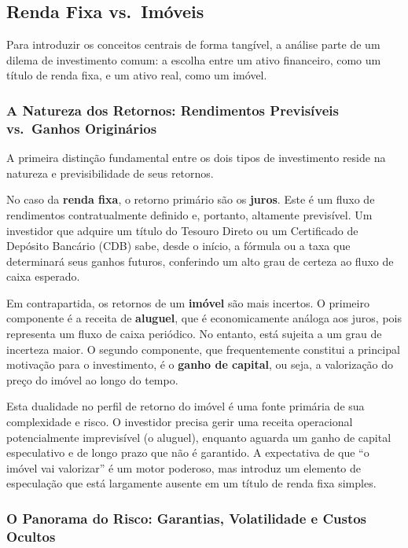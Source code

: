 \documentclass[
  a4paper,
]{book}
\begin{document}
\subsection{Renda Fixa vs.~Imóveis}\label{renda-fixa-vs.-imuxf3veis}

Para introduzir os conceitos centrais de forma tangível, a análise parte
de um dilema de investimento comum: a escolha entre um ativo financeiro,
como um título de renda fixa, e um ativo real, como um imóvel.

\subsubsection{A Natureza dos Retornos: Rendimentos Previsíveis
vs.~Ganhos
Originários}\label{a-natureza-dos-retornos-rendimentos-previsuxedveis-vs.-ganhos-originuxe1rios}

A primeira distinção fundamental entre os dois tipos de investimento
reside na natureza e previsibilidade de seus retornos.

No caso da \textbf{renda fixa}, o retorno primário são os
\textbf{juros}. Este é um fluxo de rendimentos contratualmente definido
e, portanto, altamente previsível. Um investidor que adquire um título
do Tesouro Direto ou um Certificado de Depósito Bancário (CDB) sabe,
desde o início, a fórmula ou a taxa que determinará seus ganhos futuros,
conferindo um alto grau de certeza ao fluxo de caixa esperado.

Em contrapartida, os retornos de um \textbf{imóvel} são mais incertos. O
primeiro componente é a receita de \textbf{aluguel}, que é
economicamente análoga aos juros, pois representa um fluxo de caixa
periódico. No entanto, está sujeita a um grau de incerteza maior. O
segundo componente, que frequentemente constitui a principal motivação
para o investimento, é o \textbf{ganho de capital}, ou seja, a
valorização do preço do imóvel ao longo do tempo.

Esta dualidade no perfil de retorno do imóvel é uma fonte primária de
sua complexidade e risco. O investidor precisa gerir uma receita
operacional potencialmente imprevisível (o aluguel), enquanto aguarda um
ganho de capital especulativo e de longo prazo que não é garantido. A
expectativa de que ``o imóvel vai valorizar'' é um motor poderoso, mas
introduz um elemento de especulação que está largamente ausente em um
título de renda fixa simples.

\subsubsection{O Panorama do Risco: Garantias, Volatilidade e Custos
Ocultos}\label{o-panorama-do-risco-garantias-volatilidade-e-custos-ocultos}
\end{document}
